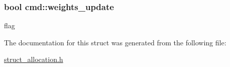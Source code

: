\subsubsection[{\texorpdfstring{weights\+\_\+update}{weights_update}}]{\setlength{\rightskip}{0pt plus 5cm}bool cmd\+::weights\+\_\+update}\hypertarget{structcmd_a7e1778b3fc9c612adf2fa1bdf6bd2de6}{}\label{structcmd_a7e1778b3fc9c612adf2fa1bdf6bd2de6}
flag 

The documentation for this struct was generated from the following file\+:\begin{DoxyCompactItemize}
\item 
\hyperlink{struct__allocation_8h}{struct\+\_\+allocation.\+h}\end{DoxyCompactItemize}

